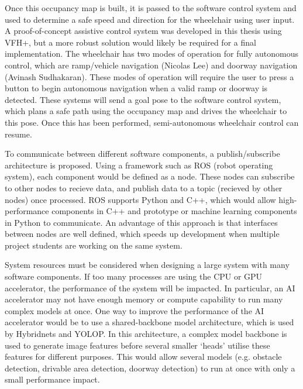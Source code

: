Once this occupancy map is built, it is passed to the software control system and used to determine
a safe speed and direction for the wheelchair using user input.
A proof-of-concept assistive control system was developed in this thesis using VFH+,
but a more robust solution would likely be required for a final implementation. The wheelchair has
two modes of operation for fully autonomous control, which are ramp/vehicle navigation (Nicolas Lee)
and doorway navigation (Avinash Sudhakaran). These modes of operation will require the user to
press a button to begin autonomous navigation when a valid ramp or doorway is detected.
These systems will send a goal pose to the software control system, which plans a safe path
using the occupancy map and drives the wheelchair to this pose. Once this has been performed,
semi-autonomous wheelchair control can resume.

To communicate between different software components, a publish/subscribe architecture
is proposed. Using a framework such as ROS (robot operating system), each component would
be defined as a node. These nodes can subscribe to other nodes to recieve data,
and publish data to a topic (recieved by other nodes) once processed. ROS supports Python and C++, which would allow
high-performance components in C++ and prototype or machine learning components in Python
to communicate. An advantage of this approach is that interfaces between nodes
are well defined, which speeds up development when multiple project students
are working on the same system.

System resources must be considered when designing a large system with many software components.
If too many processes are using the CPU or GPU accelerator, the performance of the system
will be impacted. In particular, an AI accelerator may not have enough memory or compute capability to run many complex
models at once. One way to improve the performance of the AI accelerator would be to use a shared-backbone model
architecture, which is used by Hybridnets and YOLOP. In this architecture, a complex model backbone
is used to generate image features before several smaller `heads' utilise these features for different purposes.
This would allow several models (e.g. obstacle detection, drivable area detection, doorway detection)
to run at once with only a small performance impact.

